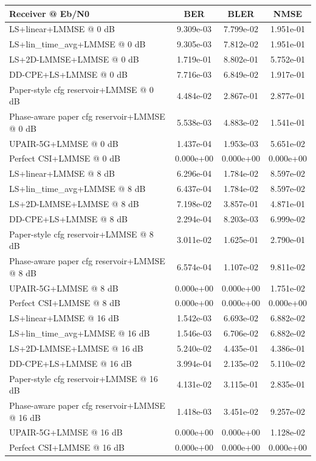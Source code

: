 \begin{tabular}{lccc}
\toprule
Receiver @ Eb/N0 & BER & BLER & NMSE \\
\midrule
LS+linear+LMMSE @ 0 dB & 9.309e-03 & 7.799e-02 & 1.951e-01 \\
LS+lin_time_avg+LMMSE @ 0 dB & 9.305e-03 & 7.812e-02 & 1.951e-01 \\
LS+2D-LMMSE+LMMSE @ 0 dB & 1.719e-01 & 8.802e-01 & 5.752e-01 \\
DD-CPE+LS+LMMSE @ 0 dB & 7.716e-03 & 6.849e-02 & 1.917e-01 \\
Paper-style cfg reservoir+LMMSE @ 0 dB & 4.484e-02 & 2.867e-01 & 2.877e-01 \\
Phase-aware paper cfg reservoir+LMMSE @ 0 dB & 5.538e-03 & 4.883e-02 & 1.541e-01 \\
UPAIR-5G+LMMSE @ 0 dB & 1.437e-04 & 1.953e-03 & 5.651e-02 \\
Perfect CSI+LMMSE @ 0 dB & 0.000e+00 & 0.000e+00 & 0.000e+00 \\
\midrule
LS+linear+LMMSE @ 8 dB & 6.296e-04 & 1.784e-02 & 8.597e-02 \\
LS+lin_time_avg+LMMSE @ 8 dB & 6.437e-04 & 1.784e-02 & 8.597e-02 \\
LS+2D-LMMSE+LMMSE @ 8 dB & 7.198e-02 & 3.857e-01 & 4.871e-01 \\
DD-CPE+LS+LMMSE @ 8 dB & 2.294e-04 & 8.203e-03 & 6.999e-02 \\
Paper-style cfg reservoir+LMMSE @ 8 dB & 3.011e-02 & 1.625e-01 & 2.790e-01 \\
Phase-aware paper cfg reservoir+LMMSE @ 8 dB & 6.574e-04 & 1.107e-02 & 9.811e-02 \\
UPAIR-5G+LMMSE @ 8 dB & 0.000e+00 & 0.000e+00 & 1.751e-02 \\
Perfect CSI+LMMSE @ 8 dB & 0.000e+00 & 0.000e+00 & 0.000e+00 \\
\midrule
LS+linear+LMMSE @ 16 dB & 1.542e-03 & 6.693e-02 & 6.882e-02 \\
LS+lin_time_avg+LMMSE @ 16 dB & 1.546e-03 & 6.706e-02 & 6.882e-02 \\
LS+2D-LMMSE+LMMSE @ 16 dB & 5.240e-02 & 4.435e-01 & 4.386e-01 \\
DD-CPE+LS+LMMSE @ 16 dB & 3.994e-04 & 2.135e-02 & 5.110e-02 \\
Paper-style cfg reservoir+LMMSE @ 16 dB & 4.131e-02 & 3.115e-01 & 2.835e-01 \\
Phase-aware paper cfg reservoir+LMMSE @ 16 dB & 1.418e-03 & 3.451e-02 & 9.257e-02 \\
UPAIR-5G+LMMSE @ 16 dB & 0.000e+00 & 0.000e+00 & 1.128e-02 \\
Perfect CSI+LMMSE @ 16 dB & 0.000e+00 & 0.000e+00 & 0.000e+00 \\
\bottomrule
\end{tabular}